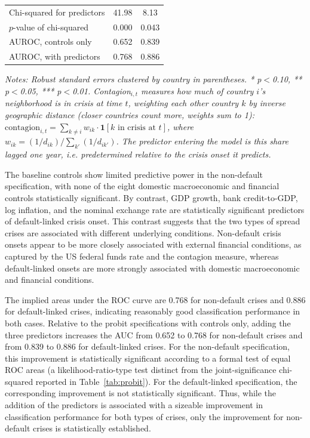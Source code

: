 \documentclass[12pt]{article}
\newcommand{\notes}[1]{\par\begingroup\footnotesize\itshape\justifying\noindent Notes: #1\par\endgroup}
\begin{document}
\begin{table}[th]
\begin{tabular}{lcc}
\midrule
Chi-squared for predictors & 41.98 & 8.13 \\
$p$-value of chi-squared & 0.000 & 0.043 \\
AUROC, controls only & 0.652 & 0.839 \\
AUROC, with predictors & 0.768 & 0.886 \\
\bottomrule
\end{tabular}
\notes{Robust standard errors clustered by country in parentheses.
* p$<$0.10, ** p$<$0.05, *** p$<$0.01. Contagion$_{i,t}$ measures how much
of country $i$'s neighborhood is in crisis at time $t$, weighting each
other country $k$ by inverse geographic distance (closer countries count
more, weights sum to 1): $\text{contagion}_{i,t} = \sum_{k \neq i} w_{ik}\cdot \mathbf{1}[k \text{ in crisis at } t]$,
where $w_{ik} = (1/d_{ik}) / \sum_{k'} (1/d_{ik'})$. The predictor
entering the model is this share lagged one year, i.e. predetermined
relative to the crisis onset it predicts.}
\end{table}

\FloatBarrier


The baseline controls show limited predictive power in the non-default
specification, with none of the eight domestic macroeconomic and
financial controls statistically significant. By contrast, GDP growth,
bank credit-to-GDP, log inflation, and the nominal exchange rate are
statistically significant predictors of default-linked crisis onset. This
contrast suggests that the two types of spread crises are associated with
different underlying conditions. Non-default crisis onsets appear to be
more closely associated with external financial conditions, as captured
by the US federal funds rate and the contagion measure, whereas
default-linked onsets are more strongly associated with domestic
macroeconomic and financial conditions.

The implied areas under the ROC curve are 0.768 for non-default crises and
0.886 for default-linked crises, indicating reasonably good classification
performance in both cases. Relative to the probit specifications with
controls only, adding the three predictors increases the AUC from 0.652
to 0.768 for non-default crises and from 0.839 to 0.886 for default-linked
crises. For the non-default specification, this improvement is
statistically significant according to a formal test of equal ROC areas
(a likelihood-ratio-type test distinct from the joint-significance
chi-squared reported in Table~\ref{tab:probit}). For the default-linked
specification, the corresponding improvement is not statistically
significant. Thus, while the addition of the predictors is associated
with a sizeable improvement in classification performance for both types
of crises, only the improvement for non-default crises is statistically
established.
\end{document}
